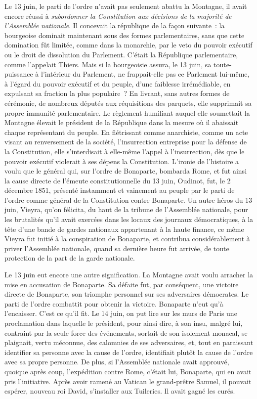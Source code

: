 \documentclass[french,twoside]{book} %
\begin{document}
Le 13 juin, le parti de l’ordre n’avait pas seulement abattu la Montagne, il avait encore réussi à \emph{subordonner la Constitution aux décisions de la majorité de l’Assemblée nationale}. Il concevait la république de la façon suivante : la bourgeoise dominait maintenant sous des formes parlementaires, sans que cette domination fût limitée, comme dans la monarchie, par le veto du pouvoir exécutif ou le droit de dissolution du Parlement. C’était la République parlementaire, comme l’appelait Thiers. Mais si la bourgeoisie assura, le 13 juin, sa toute-puissance à l’intérieur du Parlement, ne frappait-elle pas ce Parlement lui-même, à l’égard du pouvoir exécutif et du peuple, d’une faiblesse irrémédiable, en expulsant sa fraction la plus populaire ? En livrant, sans autres formes de cérémonie, de nombreux députés aux réquisitions des parquets, elle supprimait sa propre immunité parlementaire. Le règlement humiliant auquel elle soumettait la Montagne élevait le président de la République dans la mesure où il abaissait chaque représentant du peuple. En flétrissant comme anarchiste, comme un acte visant au renversement de la société, l’insurrection entreprise pour la défense de la Constitution, elle s’interdisait à elle-même l’appel à l’insurrection, dès que le pouvoir exécutif violerait à ses dépens la Constitution. L’ironie de l’histoire a voulu que le général qui, sur l’ordre de Bonaparte, bombarda Rome, et fut ainsi la cause directe de l’émeute constitutionnelle du 13 juin, Oudinot, fut, le 2 décembre 1851, présenté instamment et vainement au peuple par le parti de l’ordre comme général de la Constitution contre Bonaparte. Un autre héros du 13 juin, Vieyra, qu’on félicita, du haut de la tribune de l’Assemblée nationale, pour les brutalités qu’il avait exercées dans les locaux des journaux démocratiques, à la tête d’une bande de gardes nationaux appartenant à la haute finance, ce même Vieyra fut initié à la conspiration de Bonaparte, et contribua considérablement à priver l’Assemblée nationale, quand sa dernière heure fut arrivée, de toute protection de la part de la garde nationale.\par
Le 13 juin eut encore une autre signification. La Montagne avait voulu arracher la mise en accusation de Bonaparte. Sa défaite fut, par conséquent, une victoire directe de Bonaparte, son triomphe personnel sur ses adversaires démocrates. Le parti de l’ordre combattit pour obtenir la victoire. Bonaparte n’eut qu’à l’encaisser. C’est ce qu’il fit. Le 14 juin, on put lire sur les murs de Paris une proclamation dans laquelle le président, pour ainsi dire, à son insu, malgré lui, contraint par la seule force des événements, sortait de son isolement monacal, se plaignait, vertu méconnue, des calomnies de ses adversaires, et, tout en paraissant identifier sa personne avec la cause de l’ordre, identifiait plutôt la cause de l’ordre avec sa propre personne. De plus, si l’Assemblée nationale avait approuvé, quoique après coup, l’expédition contre Rome, c’était lui, Bonaparte, qui en avait pris l’initiative. Après avoir ramené au Vatican le grand-prêtre Samuel, il pouvait espérer, nouveau roi David, s’installer aux Tuileries. Il avait gagné les curés.\par
\end{document}

